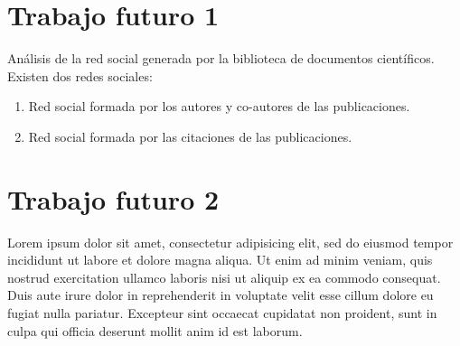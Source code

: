 \section*{Trabajo futuro 1}

Análisis de la red social generada por la biblioteca de documentos científicos. Existen dos redes sociales:

\begin{enumerate}
\item Red social formada por los autores y co-autores de las publicaciones.
\item Red social formada por las citaciones de las publicaciones.
\end{enumerate}


\section*{Trabajo futuro 2}

Lorem ipsum dolor sit amet, consectetur adipisicing elit, sed do eiusmod
tempor incididunt ut labore et dolore magna aliqua. Ut enim ad minim veniam,
quis nostrud exercitation ullamco laboris nisi ut aliquip ex ea commodo
consequat. Duis aute irure dolor in reprehenderit in voluptate velit esse
cillum dolore eu fugiat nulla pariatur. Excepteur sint occaecat cupidatat non
proident, sunt in culpa qui officia deserunt mollit anim id est laborum.